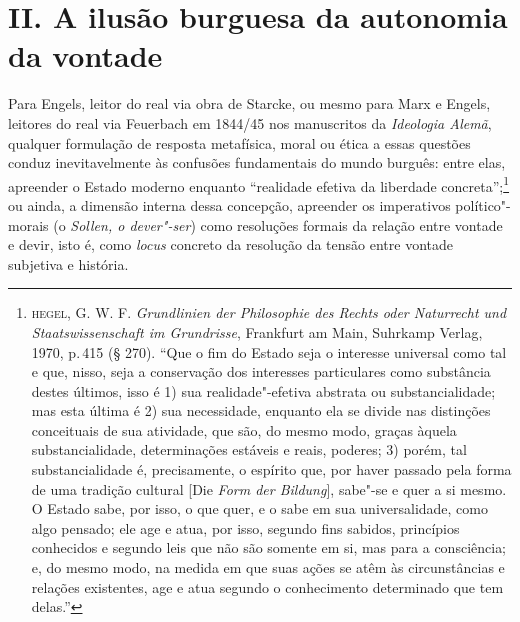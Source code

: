 \section*{II. A ilusão burguesa da autonomia da vontade}

Para Engels, leitor do real via obra de Starcke, ou mesmo para Marx e
Engels, leitores do real via Feuerbach em 1844/45 nos manuscritos da
\emph{Ideologia Alemã}, qualquer formulação de resposta metafísica,
moral ou ética a essas questões conduz inevitavelmente às confusões
fundamentais do mundo burguês: entre elas, apreender o Estado moderno
enquanto ``realidade efetiva da liberdade concreta'';\footnote{\textsc{hegel}, G.
  W. F. \emph{Grundlinien der Philosophie des Rechts oder Naturrecht und
  Staatswissenschaft im Grundrisse}, Frankfurt am Main, Suhrkamp Verlag,
  1970, p.\,415 (§ 270). ``Que o fim do Estado seja o interesse universal
  como tal e que, nisso, seja a conservação dos interesses particulares
  como substância destes últimos, isso é 1) sua realidade"-efetiva
  abstrata ou substancialidade; mas esta última é 2) sua necessidade,
  enquanto ela se divide nas distinções conceituais de sua atividade,
  que são, do mesmo modo, graças àquela substancialidade, determinações
  estáveis e reais, poderes; 3) porém, tal substancialidade é,
  precisamente, o espírito que, por haver passado pela forma de uma
  tradição cultural {[}Die \emph{Form der Bildung}{]}, sabe"-se e quer a
  si mesmo. O Estado sabe, por isso, o que quer, e o sabe em sua
  universalidade, como algo pensado; ele age e atua, por isso, segundo
  fins sabidos, princípios conhecidos e segundo leis que não são somente
  em si, mas para a consciência; e, do mesmo modo, na medida em que suas
  ações se atêm às circunstâncias e relações existentes, age e atua
  segundo o conhecimento determinado que tem delas.''} ou ainda, a
dimensão interna dessa concepção, apreender os imperativos
político"-morais (o \emph{Sollen, o dever"-ser}) como resoluções formais
da relação entre vontade e devir, isto é, como \emph{locus} concreto da
resolução da tensão entre vontade subjetiva e história.

